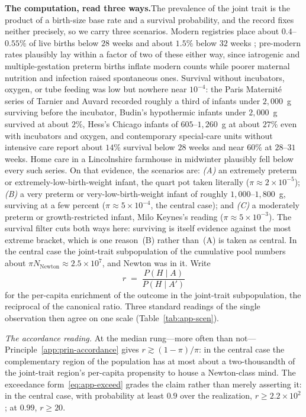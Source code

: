 \documentclass{article}
\begin{document}
\par\medskip\noindent\textbf{The computation, read three ways.}\enspace The prevalence of the joint trait is the product of a birth-size base rate and a survival probability, and the record fixes neither precisely, so we carry three scenarios. Modern registries place about $0.4$--$0.55\%$ of live births below $28$ weeks and about $1.5\%$ below $32$ weeks \cite{ohuma2023national}; pre-modern rates plausibly lay within a factor of two of these either way, since iatrogenic and multiple-gestation preterm births inflate modern counts while poorer maternal nutrition and infection raised spontaneous ones. Survival without incubators, oxygen, or tube feeding was low but nowhere near $10^{-4}$: the Paris Maternit\'e series of Tarnier and Auvard recorded roughly a third of infants under $2{,}000$~g surviving before the incubator, Budin's hypothermic infants under $2{,}000$~g survived at about $2\%$, Hess's Chicago infants of $605$--$1{,}260$~g at about $27\%$ even with incubators and oxygen, and contemporary special-care units without intensive care report about $14\%$ survival below $28$ weeks and near $60\%$ at $28$--$31$ weeks. Home care in a Lincolnshire farmhouse in midwinter plausibly fell below every such series. On that evidence, the scenarios are: \emph{(A)} an extremely preterm or extremely-low-birth-weight infant, the quart pot taken literally ($\pi \approx 2 \times 10^{-5}$); \emph{(B)} a very preterm or very-low-birth-weight infant of roughly $1{,}000$--$1{,}800$~g, surviving at a few percent ($\pi \approx 5 \times 10^{-4}$, the central case); and \emph{(C)} a moderately preterm or growth-restricted infant, Milo Keynes's reading ($\pi \approx 5 \times 10^{-3}$). The survival filter cuts both ways here: surviving is itself evidence against the most extreme bracket, which is one reason~(B) rather than~(A) is taken as central. In the central case the joint-trait subpopulation of the cumulative pool numbers about $\pi N_{\mathrm{Newton}} \approx 2.5 \times 10^{7}$, and Newton was in it. Write
\begin{equation}\label{eq:app-r}
  r \;=\; \frac{P(H \mid A)}{P(H \mid A')}
\end{equation}
for the per-capita enrichment of the outcome in the joint-trait subpopulation, the reciprocal of the canonical ratio. Three standard readings of the single observation then agree on one scale (Table~\ref{tab:app-scen}).

\emph{The accordance reading.} At the median rung---more often than not---Principle~\ref{app:prin-accordance} gives $r \gtrsim (1-\pi)/\pi$: in the central case the complementary region of the population has at most about a two-thousandth of the joint-trait region's per-capita propensity to house a Newton-class mind. The exceedance form~\eqref{eq:app-exceed} grades the claim rather than merely asserting it: in the central case, with probability at least $0.9$ over the realization, $r \geq 2.2 \times 10^{2}$; at $0.99$, $r \geq 20$.
\end{document}
